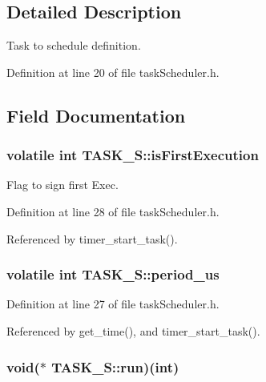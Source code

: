\subsection{Detailed Description}
Task to schedule definition. 

Definition at line 20 of file taskScheduler.h.



\subsection{Field Documentation}
\hypertarget{structTASK__S_a4b50404ee955691f1c62845cdc9de676}{
\subsubsection[{isFirstExecution}]{\setlength{\rightskip}{0pt plus 5cm}volatile int {\bf TASK\_\-S::isFirstExecution}}}
\label{structTASK__S_a4b50404ee955691f1c62845cdc9de676}


Flag to sign first Exec. 



Definition at line 28 of file taskScheduler.h.



Referenced by timer\_\-start\_\-task().

\hypertarget{structTASK__S_aabd8f80831e6cfd8e51bbd371eed907b}{
\subsubsection[{period\_\-us}]{\setlength{\rightskip}{0pt plus 5cm}volatile int {\bf TASK\_\-S::period\_\-us}}}
\label{structTASK__S_aabd8f80831e6cfd8e51bbd371eed907b}


Definition at line 27 of file taskScheduler.h.



Referenced by get\_\-time(), and timer\_\-start\_\-task().

\hypertarget{structTASK__S_a6ce7396d04fd08be26e2e8b75a276122}{
\subsubsection[{run}]{\setlength{\rightskip}{0pt plus 5cm}void($\ast$ {\bf TASK\_\-S::run})(int)}}
\label{structTASK__S_a6ce7396d04fd08be26e2e8b75a276122}


